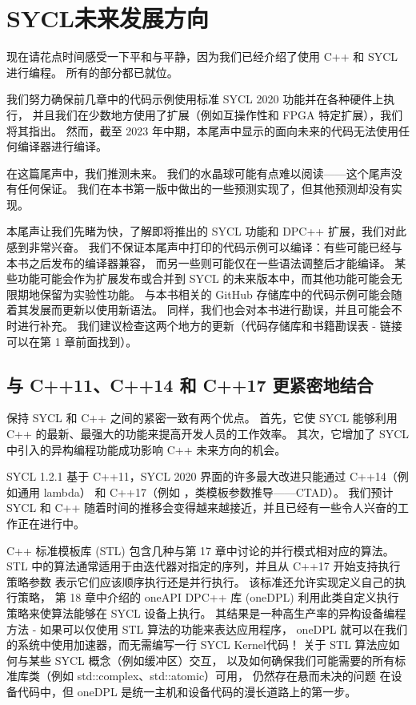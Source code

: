 \section{SYCL未来发展方向}
现在请花点时间感受一下平和与平静，因为我们已经介绍了使用 C++ 和 SYCL 进行编程。 所有的部分都已就位。

我们努力确保前几章中的代码示例使用标准 SYCL 2020 功能并在各种硬件上执行，
并且我们在少数地方使用了扩展（例如互操作性和 FPGA 特定扩展），我们将其指出。 
然而，截至 2023 年中期，本尾声中显示的面向未来的代码无法使用任何编译器进行编译。

在这篇尾声中，我们推测未来。 我们的水晶球可能有点难以阅读——这个尾声没有任何保证。 
我们在本书第一版中做出的一些预测实现了，但其他预测却没有实现。

本尾声让我们先睹为快，了解即将推出的 SYCL 功能和 DPC++ 扩展，我们对此感到非常兴奋。 
我们不保证本尾声中打印的代码示例可以编译：有些可能已经与本书之后发布的编译器兼容，
而另一些则可能仅在一些语法调整后才能编译。 
某些功能可能会作为扩展发布或合并到 SYCL 的未来版本中，而其他功能可能会无限期地保留为实验性功能。 
与本书相关的 GitHub 存储库中的代码示例可能会随着其发展而更新以使用新语法。 
同样，我们也会对本书进行勘误，并且可能会不时进行补充。 
我们建议检查这两个地方的更新（代码存储库和书籍勘误表 - 链接可以在第 1 章前面找到）。

\subsection{与 C++11、C++14 和 C++17 更紧密地结合}
保持 SYCL 和 C++ 之间的紧密一致有两个优点。 
首先，它使 SYCL 能够利用 C++ 的最新、最强大的功能来提高开发人员的工作效率。 
其次，它增加了 SYCL 中引入的异构编程功能成功影响 C++ 未来方向的机会。

SYCL 1.2.1 基于 C++11，SYCL 2020 界面的许多最大改进只能通过 C++14（例如通用 lambda）
和 C++17（例如 ，类模板参数推导——CTAD）。 
我们预计 SYCL 和 C++ 随着时间的推移会变得越来越接近，并且已经有一些令人兴奋的工作正在进行中。

C++ 标准模板库 (STL) 包含几种与第 17 章中讨论的并行模式相对应的算法。
STL 中的算法通常适用于由迭代器对指定的序列，并且从 C++17 开始支持执行策略参数 表示它们应该顺序执行还是并行执行。 
该标准还允许实现定义自己的执行策略，
第 18 章中介绍的 oneAPI DPC++ 库 (oneDPL) 利用此类自定义执行策略来使算法能够在 SYCL 设备上执行。 
其结果是一种高生产率的异构设备编程方法 - 如果可以仅使用 STL 算法的功能来表达应用程序，
oneDPL 就可以在我们的系统中使用加速器，而无需编写一行 SYCL Kernel代码！ 
关于 STL 算法应如何与某些 SYCL 概念（例如缓冲区）交互，
以及如何确保我们可能需要的所有标准库类（例如 std::complex、std::atomic）可用，
仍然存在悬而未决的问题 在设备代码中，但 oneDPL 是统一主机和设备代码的漫长道路上的第一步。

